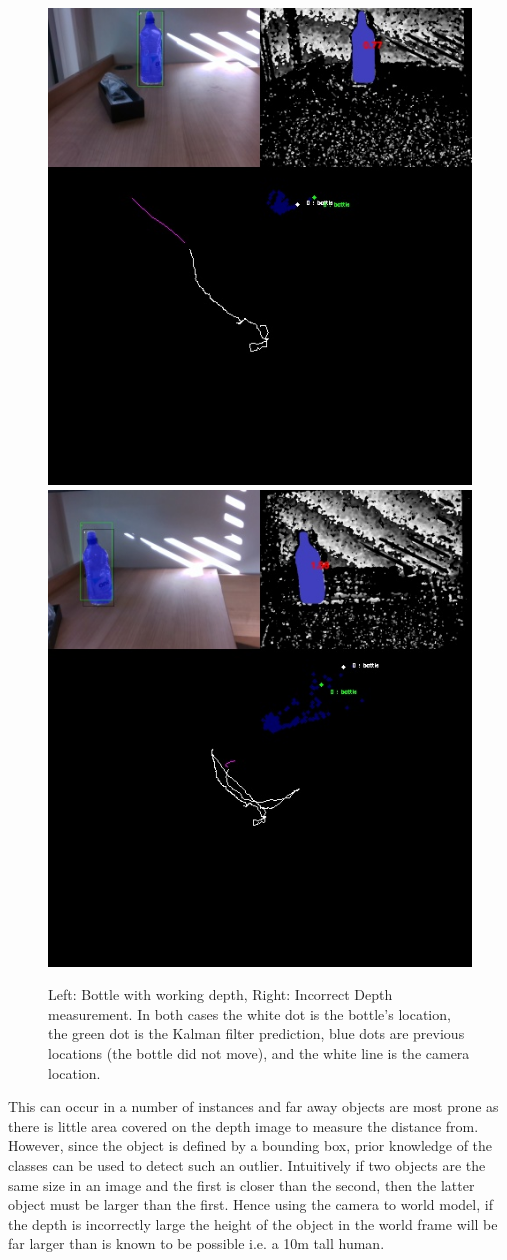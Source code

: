 \documentclass[11pt,twoside]{report}
\begin{document}
\noindent \begin{figure}[h!]
	\includegraphics[width = 0.5\hsize]{figures/bottle2.jpg}
	\includegraphics[width = 0.5\hsize]{figures/bottle1.jpg}
	\caption{Left: Bottle with working depth, Right: Incorrect Depth measurement. In both cases the white dot is the bottle's location, the green dot is the Kalman filter prediction, blue dots are previous locations (the bottle did not move), and the white line is the camera location.}
	\label{bottle}
\end{figure}

This can occur in a number of instances and far away objects are most prone as there is little area covered on the depth image to measure the distance from. However, since the object is defined by a bounding box, prior knowledge of the classes can be used to detect such an outlier. Intuitively if two objects are the same size in an image and the first is closer than the second, then the latter object must be larger than the first. Hence using the camera to world model, if the depth is incorrectly large the height of the object in the world frame will be far larger than is known to be possible i.e. a 10m tall human.
\end{document}
